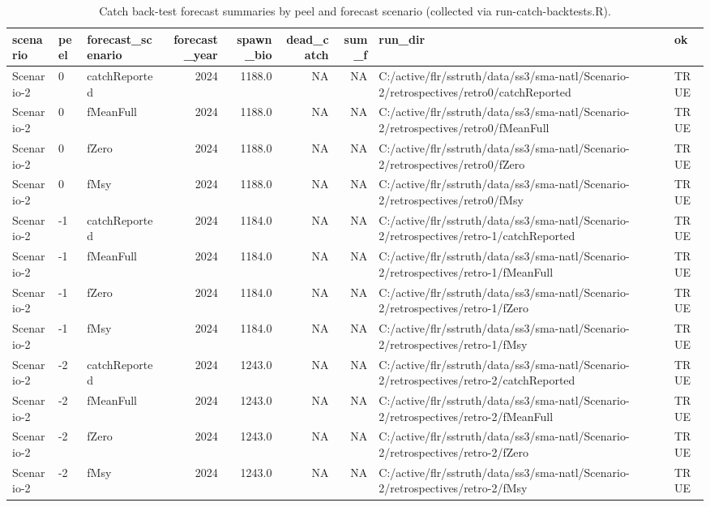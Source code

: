 \begin{table}

\caption{\label{tab:robustness-catch-backtest}Catch back-test forecast summaries by peel and forecast scenario (collected via run-catch-backtests.R).}
\centering
\begin{tabular}[t]{lllrrrrll}
\toprule
scenario & peel & forecast\_scenario & forecast\_year & spawn\_bio & dead\_catch & sum\_f & run\_dir & ok\\
\midrule
Scenario-2 & 0 & catchReported & 2024 & 1188.0 & NA & NA & C:/active/flr/sstruth/data/ss3/sma-natl/Scenario-2/retrospectives/retro0/catchReported & TRUE\\
Scenario-2 & 0 & fMeanFull & 2024 & 1188.0 & NA & NA & C:/active/flr/sstruth/data/ss3/sma-natl/Scenario-2/retrospectives/retro0/fMeanFull & TRUE\\
Scenario-2 & 0 & fZero & 2024 & 1188.0 & NA & NA & C:/active/flr/sstruth/data/ss3/sma-natl/Scenario-2/retrospectives/retro0/fZero & TRUE\\
Scenario-2 & 0 & fMsy & 2024 & 1188.0 & NA & NA & C:/active/flr/sstruth/data/ss3/sma-natl/Scenario-2/retrospectives/retro0/fMsy & TRUE\\
Scenario-2 & -1 & catchReported & 2024 & 1184.0 & NA & NA & C:/active/flr/sstruth/data/ss3/sma-natl/Scenario-2/retrospectives/retro-1/catchReported & TRUE\\
\addlinespace
Scenario-2 & -1 & fMeanFull & 2024 & 1184.0 & NA & NA & C:/active/flr/sstruth/data/ss3/sma-natl/Scenario-2/retrospectives/retro-1/fMeanFull & TRUE\\
Scenario-2 & -1 & fZero & 2024 & 1184.0 & NA & NA & C:/active/flr/sstruth/data/ss3/sma-natl/Scenario-2/retrospectives/retro-1/fZero & TRUE\\
Scenario-2 & -1 & fMsy & 2024 & 1184.0 & NA & NA & C:/active/flr/sstruth/data/ss3/sma-natl/Scenario-2/retrospectives/retro-1/fMsy & TRUE\\
Scenario-2 & -2 & catchReported & 2024 & 1243.0 & NA & NA & C:/active/flr/sstruth/data/ss3/sma-natl/Scenario-2/retrospectives/retro-2/catchReported & TRUE\\
Scenario-2 & -2 & fMeanFull & 2024 & 1243.0 & NA & NA & C:/active/flr/sstruth/data/ss3/sma-natl/Scenario-2/retrospectives/retro-2/fMeanFull & TRUE\\
\addlinespace
Scenario-2 & -2 & fZero & 2024 & 1243.0 & NA & NA & C:/active/flr/sstruth/data/ss3/sma-natl/Scenario-2/retrospectives/retro-2/fZero & TRUE\\
Scenario-2 & -2 & fMsy & 2024 & 1243.0 & NA & NA & C:/active/flr/sstruth/data/ss3/sma-natl/Scenario-2/retrospectives/retro-2/fMsy & TRUE\\

\end{tabular}
\end{table}
